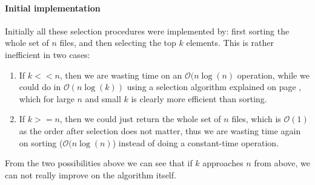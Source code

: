 \documentclass[12pt,twoside,notitlepage]{report}
\begin{document}
\paragraph{Initial implementation}
Initially all these selection procedures were implemented by: first sorting the whole set of $n$ files, and then selecting the top $k$ elements. This is rather inefficient in two cases:
\begin{enumerate}
\item If $k << n$, then we are wasting time on an $\mathcal{O}(n\log(n)$ operation, while we could do in $\mathcal{O}(n\log(k))$ using a selection algorithm explained on page \pageref{gettopk}, which for large $n$ and small $k$ is clearly more efficient than sorting.
\item If $k >= n$, then we could just return the whole set of $n$ files, which is $\mathcal{O}(1)$ as the order after selection does not matter, thus we are wasting time again on sorting ($\mathcal{O}(n\log(n)$) instead of doing a constant-time operation.
\end{enumerate}
From the two possibilities above we can see that if $k$ approaches $n$ from above, we can not really improve on the algorithm itself.
\end{document}
